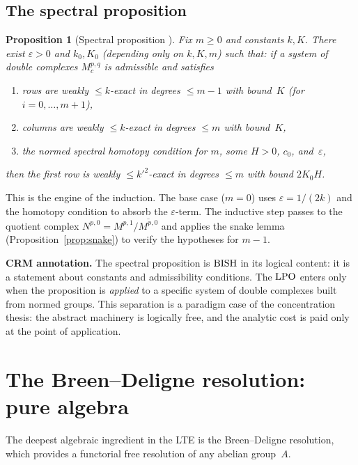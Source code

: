 \documentclass[11pt,a4paper]{article}
\theoremstyle{plain}
\newtheorem{proposition}[theorem]{Proposition}
\theoremstyle{definition}
\newcommand{\BISH}{\textup{BISH}}
\newcommand{\LPO}{\textup{LPO}}
\begin{document}
\subsection{The spectral proposition}

\begin{proposition}[Spectral proposition {\cite{Commelin2022}}]
\label{prop:spectral}
Fix $m \geq 0$ and constants $k, K$.  There exist $\varepsilon > 0$
and $k_0, K_0$ (depending only on $k, K, m$) such that: if
a system of double complexes $M^{p,q}_c$ is admissible and satisfies
\begin{enumerate}[nosep,label=(\roman*)]
\item rows are weakly $\leq k$-exact in degrees $\leq m-1$ with
  bound~$K$ (for $i = 0, \ldots, m+1$),
\item columns are weakly $\leq k$-exact in degrees $\leq m$ with
  bound~$K$,
\item the normed spectral homotopy condition for $m$, some $H > 0$,
  $c_0$, and~$\varepsilon$,
\end{enumerate}
then the first row is weakly $\leq k'^2$-exact in degrees $\leq m$
with bound $2K_0 H$.
\end{proposition}

\noindent This is the engine of the induction.  The base case ($m=0$)
uses $\varepsilon = 1/(2k)$ and the homotopy condition to absorb the
$\varepsilon$-term.  The inductive step passes to the quotient complex
$N^{p,0} = M^{p,1}/\overline{M^{p,0}}$ and applies the snake lemma
(Proposition~\ref{prop:snake}) to verify the hypotheses for $m-1$.

\medskip
\noindent\textbf{CRM annotation.}
The spectral proposition is $\BISH$ in its logical content: it is a
statement about constants and admissibility conditions.  The $\LPO$
enters only when the proposition is \emph{applied} to a specific
system of double complexes built from normed groups.  This separation
is a paradigm case of the concentration thesis: the abstract machinery
is logically free, and the analytic cost is paid only at the
point of application.


\section{The Breen--Deligne resolution: pure algebra}\label{sec:BD}

The deepest algebraic ingredient in the LTE is the Breen--Deligne
resolution, which provides a functorial free resolution of any
abelian group~$A$.
\end{document}
